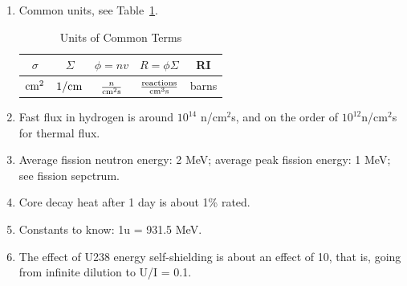 \documentclass{school-22.211-notes}
\date{May 23, 2012}
\begin{document}
\maketitle


\begin{enumerate}
\item Common units, see Table~\ref{units}.
\begin{table}[ht]
  \centering
  \begin{tabular}{|c|c|c|c|c|} \hline
   $\sigma$ & $\Sigma$ & $\phi = nv$ & $R = \phi \Sigma$ & RI  \\ \hline
   $\mathrm{cm}^2$ & $1/\mathrm{cm}$ & $\frac{n}{\mathrm{cm}^2 \mathrm{s}}$ & $\frac{\mathrm{reactions}}{\mathrm{cm}^3 \mathrm{s}}$ & barns \\ \hline
  \end{tabular}
  \caption{Units of Common Terms} \label{units}
\end{table}
\item Fast flux in hydrogen is around $10^{14}$ n/cm$^2$s, and on the order of $10^{12}$n/cm$^2$s for thermal flux. 
\item Average fission neutron energy: 2 MeV; average peak fission energy: 1 MeV; see fission sepctrum. 
\item Core decay heat after 1 day is about 1\% rated. 
\item Constants to know: 1u = 931.5 MeV. 
\item The effect of U238 energy self-shielding is about an effect of 10, that is, going from infinite dilution to U/I = 0.1. 
\end{enumerate}
\end{document}
